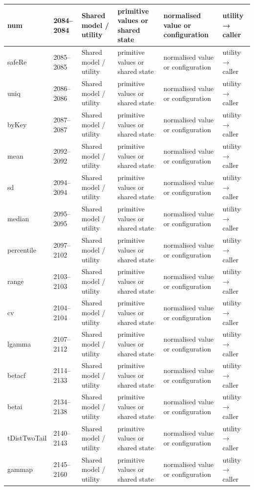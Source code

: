 \begin{landscape}
\begin{longtable}{@{}p{3.2cm}p{1.45cm}p{2.7cm}p{4.0cm}p{4.0cm}p{3.0cm}@{}}
num & 2084--2084 & Shared model / utility & primitive values or shared state & normalised value or configuration & utility → caller \\\hline
safeRe & 2085--2085 & Shared model / utility & primitive values or shared state & normalised value or configuration & utility → caller \\\hline
uniq & 2086--2086 & Shared model / utility & primitive values or shared state & normalised value or configuration & utility → caller \\\hline
byKey & 2087--2087 & Shared model / utility & primitive values or shared state & normalised value or configuration & utility → caller \\\hline
mean & 2092--2092 & Shared model / utility & primitive values or shared state & normalised value or configuration & utility → caller \\\hline
sd & 2094--2094 & Shared model / utility & primitive values or shared state & normalised value or configuration & utility → caller \\\hline
median & 2095--2095 & Shared model / utility & primitive values or shared state & normalised value or configuration & utility → caller \\\hline
percentile & 2097--2102 & Shared model / utility & primitive values or shared state & normalised value or configuration & utility → caller \\\hline
range & 2103--2103 & Shared model / utility & primitive values or shared state & normalised value or configuration & utility → caller \\\hline
cv & 2104--2104 & Shared model / utility & primitive values or shared state & normalised value or configuration & utility → caller \\\hline
lgamma & 2107--2112 & Shared model / utility & primitive values or shared state & normalised value or configuration & utility → caller \\\hline
betacf & 2114--2133 & Shared model / utility & primitive values or shared state & normalised value or configuration & utility → caller \\\hline
betai & 2134--2138 & Shared model / utility & primitive values or shared state & normalised value or configuration & utility → caller \\\hline
tDistTwoTail & 2140--2143 & Shared model / utility & primitive values or shared state & normalised value or configuration & utility → caller \\\hline
gammap & 2145--2160 & Shared model / utility & primitive values or shared state & normalised value or configuration & utility → caller \\\hline

\end{longtable}
\end{landscape}
